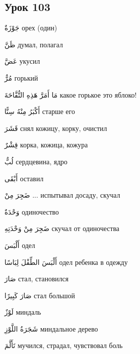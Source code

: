 \documentclass[a5paper]{article}
\newcommand\textstyleDropCaps[1]{#1}
\newcommand\textstyleCaptioncharacters[1]{#1}
\begin{document}
\subsection[Урок 103‎]{\textstyleDropCaps{Урок 103‎}}
\textstyleCaptioncharacters{جَوْزَةٌ }\textstyleDropCaps{орех (один)‎}

\textstyleCaptioncharacters{ظَنَّ }\textstyleDropCaps{думал, полагал‎}

\textstyleCaptioncharacters{عَضَّ }\textstyleDropCaps{укусил‎}

\textstyleCaptioncharacters{مُرٌّ }\textstyleDropCaps{горький‎}

\textstyleCaptioncharacters{مَا أَمَرَّ هَذِهِ التُّفَّاحَةَ }\textstyleDropCaps{какое горькое это яблоко!‎}

\textstyleCaptioncharacters{أَكْبَرُ مِنْهُ سِنًّا }\textstyleDropCaps{старше его‎}

\textstyleCaptioncharacters{قَشَرَ }\textstyleDropCaps{снял кожицу, корку, очистил‎}

\textstyleCaptioncharacters{قِشْرٌ }\textstyleDropCaps{корка, кожица, кожу­ра‎}

\textstyleCaptioncharacters{لُبٌّ }\textstyleDropCaps{сердцевина, ядро‎}

\textstyleCaptioncharacters{أَبْقَى }\textstyleDropCaps{оставил‎}

\textstyleCaptioncharacters{ضَجِرَ مِنْ ... }\textstyleDropCaps{испытывал досаду, скучал‎}

\textstyleCaptioncharacters{وَحْدَةٌ }\textstyleDropCaps{одиночество‎}

\textstyleCaptioncharacters{ضَجِرَ مِنْ وَحْدَتِهِ }\textstyleDropCaps{ску­чал от одиночества‎}

\textstyleCaptioncharacters{أَلْبَسَ }\textstyleDropCaps{одел‎}

\textstyleCaptioncharacters{أَلْبَسَ الطِّفْلَ لِبَاسًا }\textstyleDropCaps{одел ребенка в одежду‎}

\textstyleCaptioncharacters{صَارَ }\textstyleDropCaps{стал, становился‎}

\textstyleCaptioncharacters{صَارَ كَبِيرًا }\textstyleDropCaps{стал большой‎}

\textstyleCaptioncharacters{لَوْزٌ }\textstyleDropCaps{миндаль‎}

\textstyleCaptioncharacters{شَجَرَةُ اللَّوْزِ }\textstyleDropCaps{миндальное дерево‎}

\textstyleCaptioncharacters{تَأَلَّمَ }\textstyleDropCaps{мучился, страдал, чув­ствовал боль‎}
\end{document}
